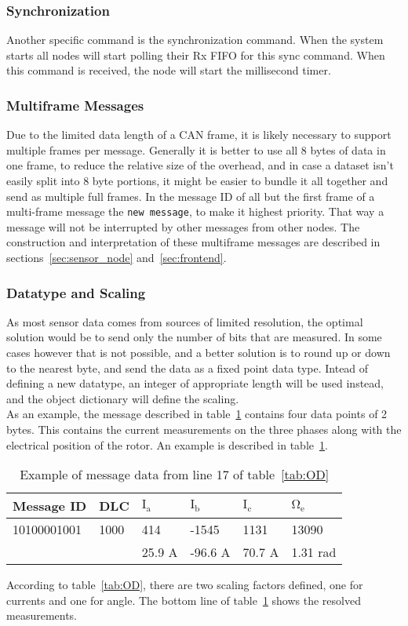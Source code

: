\subsubsection*{Synchronization}
Another specific command is the synchronization command. 
When the system starts all nodes will start polling their Rx FIFO for this sync command. 
When this command is received, the node will start the millisecond timer.

\subsubsection*{Multiframe Messages}
Due to the limited data length of a CAN frame, it is likely necessary to support multiple frames per message. 
Generally it is better to use all 8 bytes of data in one frame, to reduce the relative size of the overhead, and in case a dataset isn't easily split into 8 byte portions, it might be easier to bundle it all together and send as multiple full frames. 
In the message ID of all but the first frame of a multi-frame message the \texttt{new message}, to make it highest priority.
That way a message will not be interrupted by other messages from other nodes.
The construction and interpretation of these multiframe messages are described in sections~\ref{sec:sensor_node} and~\ref{sec:frontend}.

\subsubsection*{Datatype and Scaling}
As most sensor data comes from sources of limited resolution, the optimal solution would be to send only the number of bits that are measured. 
In some cases however that is not possible, and a better solution is to round up or down to the nearest byte, and send the data as a fixed point data type.
Intead of defining a new datatype, an integer of appropriate length will be used instead, and the object dictionary will define the scaling. \\

As an example, the message described in table~\ref{tab:message17_OD} contains four data points of 2 bytes. 
This contains the current measurements on the three phases along with the electrical position of the rotor.
An example is described in table~\ref{tab:message17_OD}.

\begin{table}[h]
	\centering
	\begin{tabular}{l|l|l|l|l|l}
		Message ID & DLC & $\mathrm{I_a}$ & $\mathrm{I_b}$ & $\mathrm{I_c}$ & $\mathrm{\Omega _e}$ \\ 
		\hline
		10100001001 & 1000 & 414 & -1545 & 1131 & 13090 \\
		\hline
		 & & 25.9 A & -96.6 A & 70.7 A & 1.31 rad
	\end{tabular}
	\caption{Example of message data from line 17 of table~\ref{tab:OD}}
	\label{tab:message17_OD}
\end{table}
According to table~\ref{tab:OD}, there are two scaling factors defined, one for currents and one for angle. 
The bottom line of table~\ref{tab:message17_OD} shows the resolved measurements.
